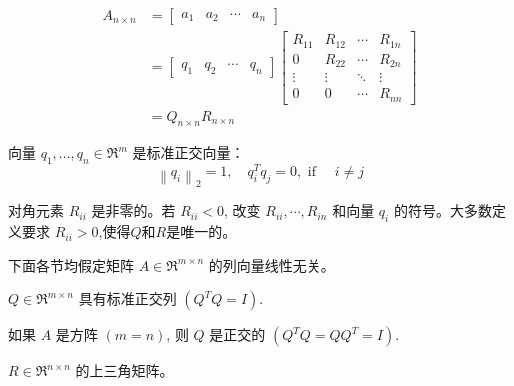 \begin{theorem}[QR Factorization]
    
    \begin{equation}\begin{aligned} A_{n  \times n}&=\left[\begin{array}{llll}a_{1} & a_{2} & \cdots & a_{n}\end{array}\right]\\
        &=\left[\begin{array}{llll}q_{1} & q_{2} & \cdots & q_{n}\end{array}\right]\left[\begin{array}{cccc}R_{11} & R_{12} & \cdots & R_{1 n} \\ 0 & R_{22} & \cdots & R_{2 n} \\ \vdots & \vdots & \ddots & \vdots \\ 0 & 0 & \cdots & R_{n n}\end{array}\right]\\
        &=Q_{n  \times n}R_{n  \times  n}
        \end{aligned}\end{equation}

向量 $ q_{1}, \ldots, q_{n} \in \mathfrak{R}^{m} $ 是标准正交向量：
\begin{equation}
\left\|q_{i}\right\|_{2}=1, \quad q_{i}^{T} q_{j}=0, \text { if } \quad i \neq j
\end{equation}

对角元素 $ R_{i i} $ 是非零的。若 $ R_{i i}<0 $, 改变 $ R_{i i}, \cdots, R_{i n} $ 和向量 $ q_{i} $ 的符号。大多数定义要求 $ R_{i i}>0 $,使得$Q$和$R$是唯一的。
\end{theorem}

\begin{remark}
    下面各节均假定矩阵 $ A \in \mathfrak{R}^{m \times n} $ 的列向量线性无关。
\end{remark}

\begin{corollary}
    $ Q \in \mathfrak{R}^{m \times n} $ 具有标准正交列 $ \left(Q^{T} Q=I\right) $.
\end{corollary}

\begin{corollary}
    如果 $ A $ 是方阵 $ ( {m}= {n}) $, 则 $ Q $ 是正交的 $ \left(Q^{T} Q=Q Q^{T}=I\right) $.
\end{corollary}

\begin{corollary}
    $ R \in \mathfrak{R}^{n \times n} $ 的上三角矩阵。
\end{corollary}

